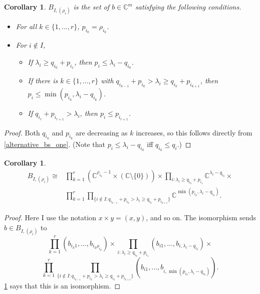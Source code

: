 \documentclass[12pt,psamsfonts]{article}
\newtheorem{corollary}[theorem]{Corollary}
\begin{document}
\begin{corollary}\label{alternative_bs_two}
    \(B_{I, (\rho_i)}\) is the set of \(b \in \mathbb{C}^m\) satisfying the following conditions.
    \begin{itemize}
        \item For all \(k \in \{1, ..., r\}\), \(p_{i_k} = \rho_{i_k}\).
        \item For \(i \notin I\),
        \begin{itemize}
            \item If \(\lambda_i \geq q_{i_0} + p_{i_1}\), then \(p_i \leq \lambda_i - q_{i_0}\).
            \item If there is \(k \in \{1, ..., r\}\) with \(q_{i_{k - 1}} + p_{i_k} > \lambda_i \geq q_{i_k} + p_{i_{k + 1}}\), then \(p_i \leq \min(p_{i_k}, \lambda_i - q_{i_k})\).
            \item If \(q_{i_r} + p_{i_{r + 1}} > \lambda_i\), then \(p_i \leq p_{i_{r + 1}}\).
        \end{itemize}
    \end{itemize}
\end{corollary}
\begin{proof}
    Both \(q_{i_k}\) and \(p_{i_k}\) are decreasing as \(k\) increases, so this follows directly from \cref{alternative_bs_one}.
    (Note that \(p_i \leq \lambda_i - q_{i_k}\) iff \(q_{i_k} \leq q_i\).)
\end{proof}

\begin{corollary}\label{bs_iso}
    \begin{align*}
        B_{I, (\rho_i)} \cong & \prod_{k = 1}^r (\mathbb{C}^{\rho_{i_k} - 1} \times (\mathbb{C} \setminus \{0\})) \times \prod_{i : \lambda_i \geq q_{i_0} + p_{i_1}} \mathbb{C}^{\lambda_i - q_{i_0}} \times \\
        & \prod_{k = 1}^r \prod_{\{i \notin I : q_{i_{k - 1}} + p_{i_k} > \lambda_i \geq q_{i_k} + p_{i_{k + 1}}\}}\mathbb{C}^{\min(p_{i_k}, \lambda_i - q_{i_k})}.
    \end{align*}
\end{corollary}
\begin{proof}
    Here I use the notation \(x \times y = (x, y)\), and so on.
    The isomorphism sends \(b \in B_{I, (\rho_i)}\) to 
    \[\prod_{k = 1}^{r}(b_{i_k1},..., b_{i_k\rho_{i_k}}) \times \prod_{i : \lambda_i \geq q_{i_0} + p_{i_1}} (b_{i1}, ..., b_{i, \lambda_i - q_{i_0}}) \times\]
    \[\prod_{k = 1}^r \prod_{\{i \notin I : q_{i_{k - 1}} + p_{i_k} > \lambda_i \geq q_{i_k} + p_{i_{k + 1}}\}} (b_{i1}, ..., b_{i,\min(p_{i_k}, \lambda_i - q_{i_k})}).\]
    \cref{alternative_bs_two} says that this is an isomorphism.
\end{proof}
\end{document}
